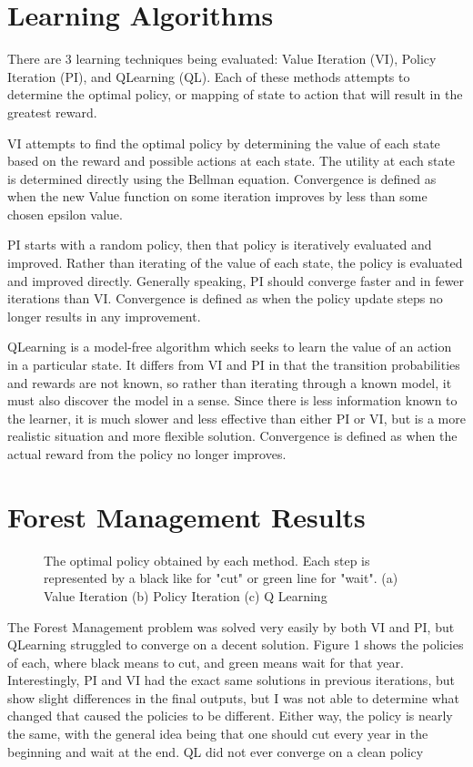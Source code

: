 \documentclass[
	letterpaper, %
]{mlreport}
\begin{document}
\section{Learning Algorithms}
There are 3 learning techniques being evaluated: Value Iteration (VI), Policy Iteration (PI), and QLearning (QL). Each of these methods attempts to determine the optimal policy, or mapping of state to action that will result in the greatest reward.

VI attempts to find the optimal policy by determining the value of each state based on the reward and possible actions at each state. The utility at each state is determined directly using the Bellman equation. Convergence is defined as when the new Value function on some iteration improves by less than some chosen epsilon value.

PI starts with a random policy, then that policy is iteratively evaluated and improved. Rather than iterating of the value of each state, the policy is evaluated and improved directly. Generally speaking, PI should converge faster and in fewer iterations than VI. Convergence is defined as when the policy update steps no longer results in any improvement.

QLearning is a model-free algorithm which seeks to learn the value of an action in a particular state. It differs from VI and PI in that the transition probabilities and rewards are not known, so rather than iterating through a known model, it must also discover the model in a sense. Since there is less information known to the learner, it is much slower and less effective than either PI or VI, but is a more realistic situation and more flexible solution. Convergence is defined as when the actual reward from the policy no longer improves.

\section{Forest Management Results}
\begin{figure}
	\centering
	\caption{The optimal policy obtained by each method. Each step is represented by a black like for "cut" or green line for "wait". (a) Value Iteration (b) Policy Iteration (c) Q Learning}
	\label{fig:fig1}
\end{figure}
The Forest Management problem was solved very easily by both VI and PI, but QLearning struggled to converge on a decent solution. Figure 1 shows the policies of each, where black means to cut, and green means wait for that year. Interestingly, PI and VI had the exact same solutions in previous iterations, but show slight differences in the final outputs, but I was not able to determine what changed that caused the policies to be different. Either way, the policy is nearly the same, with the general idea being that one should cut every year in the beginning and wait at the end. QL did not ever converge on a clean policy
\end{document}
